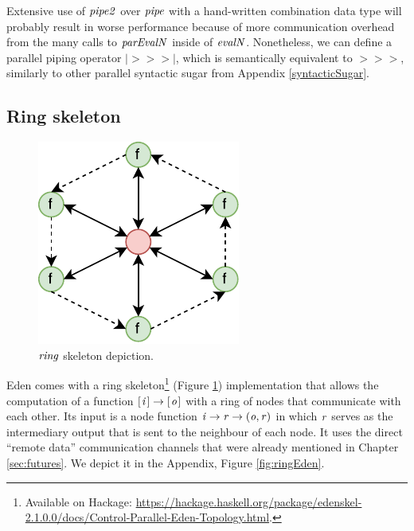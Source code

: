 \documentclass[paper=A4,twoside=true,openright,parskip=full,chapterprefix=true,headings=normal,bibliography=totoc,listof=totoc,titlepage=on,captions=tableabove,draft=false,british]{scrreprt}%
\renewcommand{\enquote}[1]{{``}#1{''}}
\begin{document}
Extensive use of \ensuremath{\Varid{pipe2}} over \ensuremath{\Varid{pipe}} with a hand-written combination
data type will probably result in worse performance because of more
communication overhead from the many calls to \ensuremath{\Varid{parEvalN}} inside of
\ensuremath{\Varid{evalN}}. Nonetheless, we can define a parallel piping operator
\ensuremath{\mathbin{|\!>\!\!>\!\!>\!|}}, which is semantically equivalent to \ensuremath{\mathbin{>\!\!>\!\!>}}, similarly to other
parallel syntactic sugar from Appendix \ref{syntacticSugar}.

\hypertarget{ring-skeleton}{%
\subsection{Ring skeleton}\label{ring-skeleton}}

\label{sec:ring}

\begin{figure}
\centering
\includegraphics{src/img/ringImg.pdf}
\caption{\ensuremath{\Varid{ring}} skeleton depiction.\label{fig:ringImg}}
\end{figure}

Eden comes with a ring skeleton\footnote{Available on Hackage:
  \url{https://hackage.haskell.org/package/edenskel-2.1.0.0/docs/Control-Parallel-Eden-Topology.html}.}
(Figure \ref{fig:ringImg}) implementation that allows the computation of
a function \ensuremath{[\mskip1.5mu \Varid{i}\mskip1.5mu]\to [\mskip1.5mu \Varid{o}\mskip1.5mu]} with a ring of nodes that communicate with each
other. Its input is a node function \ensuremath{\Varid{i}\to \Varid{r}\to (\Varid{o},\Varid{r})} in which \ensuremath{\Varid{r}}
serves as the intermediary output that is sent to the neighbour of each
node. It uses the direct \enquote{remote data} communication channels
that were already mentioned in Chapter \ref{sec:futures}. We depict it
in the Appendix, Figure \ref{fig:ringEden}.
\end{document}
